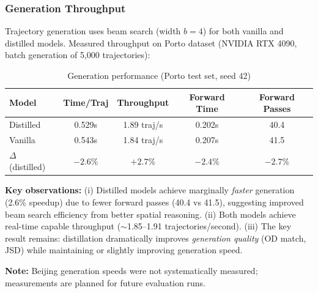 \subsubsection{Generation Throughput}

Trajectory generation uses beam search (width $b=4$) for both vanilla and distilled models. Measured throughput on Porto dataset (NVIDIA RTX 4090, batch generation of 5,000 trajectories):

\begin{table}[h]
    \centering
    \caption{Generation performance (Porto test set, seed 42)}
    \label{tab:generation-perf}
    \small
    \begin{tabular}{lcccc}
        \toprule
        \textbf{Model}      & \textbf{Time/Traj} & \textbf{Throughput} & \textbf{Forward Time} & \textbf{Forward Passes} \\
        \midrule
        Distilled           & 0.529s             & 1.89 traj/s         & 0.202s                & 40.4                    \\
        Vanilla             & 0.543s             & 1.84 traj/s         & 0.207s                & 41.5                    \\
        $\Delta$ (distilled) & $-2.6$\%           & $+2.7$\%            & $-2.4$\%              & $-2.7$\%                \\
        \bottomrule
    \end{tabular}
\end{table}

\textbf{Key observations:} (i) Distilled models achieve marginally \emph{faster} generation (2.6\% speedup) due to fewer forward passes (40.4 vs 41.5), suggesting improved beam search efficiency from better spatial reasoning. (ii) Both models achieve real-time capable throughput ($\sim$1.85--1.91 trajectories/second). (iii) The key result remains: distillation dramatically improves \emph{generation quality} (OD match, JSD) while maintaining or slightly improving generation speed.

\textbf{Note:} Beijing generation speeds were not systematically measured; measurements are planned for future evaluation runs.


